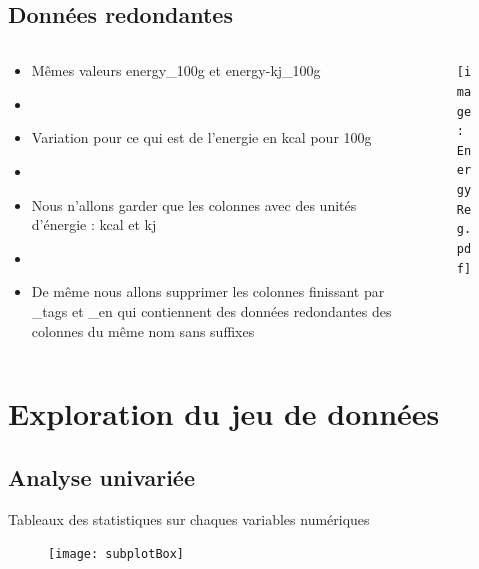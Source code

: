 \subsection{Données redondantes}
\begin{frame}{\insertsubsection}
  \begin{columns}
    \begin{column}{.4\textwidth}
      \begin{itemize}
        \item Mêmes valeurs energy\_100g et energy-kj\_100g
        \item[]
        \item Variation pour ce qui est de l'energie en kcal pour 100g
        \item[]
        \item Nous n'allons garder que les colonnes avec des unités d'énergie : kcal et kj
        \item[]
        \item De même nous allons supprimer les colonnes finissant par \_tags et \_en
              qui contiennent des données redondantes des colonnes du même nom sans suffixes
      \end{itemize}
    \end{column}
    \begin{column}{.6\textwidth}
      \begin{figure}
        \texttt{[image: EnergyReg.pdf]}
      \end{figure}
    \end{column}
  \end{columns}
\end{frame}

\section{Exploration du jeu de données}
\subsection{Analyse univariée}
\begin{frame}{\insertsubsection}
  \begin{table}
    \tiny
    
    
    
    \caption{Tableaux des statistiques sur chaques variables numériques}
  \end{table}
\end{frame}

\begin{frame}{\insertsubsection}
  \begin{figure}
    \texttt{[image: subplotBox]}
  \end{figure}
\end{frame}

